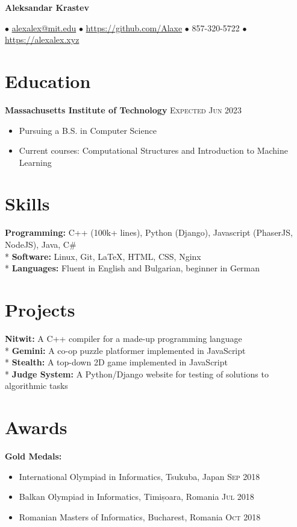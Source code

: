 \documentclass[letterpaper,11pt]{article}
\author{Aleksandar Krastev}
\date{2019-09-03}
\newcommand{\noskip}{\vspace{-\parskip}}
\begin{document}
\centerline{{\Huge \bf Aleksandar Krastev}}
$\bullet$ \href{mailto:alexalex@mit.edu}{alexalex@mit.edu} \hfill
$\bullet$ \href{https://github.com/Alaxe}{https://github.com/Alaxe} \hfill
$\bullet$ 857-320-5722 \hfill
$\bullet$ \href{https://alexalex.xyz}{https://alexalex.xyz}

\noskip
\section*{Education}
\textbf{Massachusetts Institute of Technology}
\hfill
\textsc{Expected Jun 2023}

\noskip
\begin{itemize}
    \item Pursuing a B.S. in Computer Science
    \item Current courses: Computational Structures and Introduction to Machine
        Learning
\end{itemize}

\section*{Skills}
\textbf{Programming:} C++ (100k+ lines), Python (Django), Javascript
    (PhaserJS, NodeJS), Java, C\#\\*
\textbf{Software:} Linux, Git, LaTeX, HTML, CSS, Nginx\\*
\textbf{Languages:} Fluent in English and Bulgarian, beginner in German

\section*{Projects}
\textbf{Nitwit:} A C++ compiler for a made-up programming language\\*
\textbf{Gemini:} A co-op puzzle platformer implemented in JavaScript\\*
\textbf{Stealth:} A top-down 2D game implemented in JavaScript\\*
\textbf{Judge System:} A Python/Django website for testing of solutions
to algorithmic tasks

\section*{Awards}
\textbf{Gold Medals:}
\noskip
\begin{itemize}
    \item International Olympiad in Informatics, Tsukuba, Japan
        \hfill \textsc{Sep 2018}
    \item Balkan Olympiad in Informatics, Timișoara, Romania
        \hfill \textsc{Jul 2018}
    \item Romanian Masters of Informatics, Bucharest, Romania
        \hfill \textsc{Oct 2018}
\end{itemize}
\end{document}
